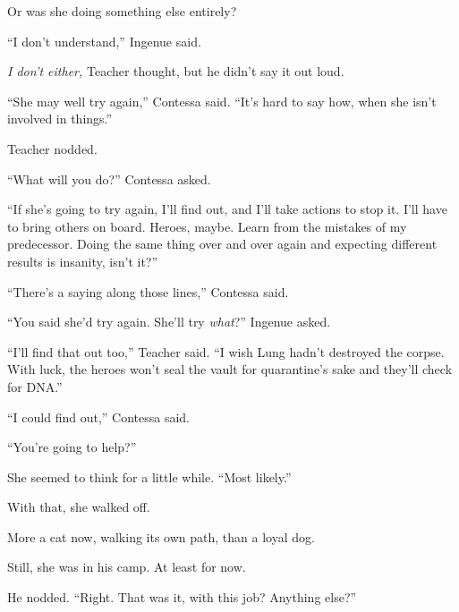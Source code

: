 Or was she doing something else entirely?



``I don't understand,'' Ingenue said.



\emph{I don't either, }Teacher thought, but he didn't say it out loud.



``She may well try again,'' Contessa said.  ``It's hard to say how, when she isn't involved in things.''



Teacher nodded.



``What will you do?''  Contessa asked.



``If she's going to try again, I'll find out, and I'll take actions to stop it.  I'll have to bring others on board.  Heroes, maybe.  Learn from the mistakes of my predecessor.  Doing the same thing over and over again and expecting different results is insanity, isn't it?''



``There's a saying along those lines,'' Contessa said.



``You said she'd try again.  She'll try \emph{what}?''  Ingenue asked.



``I'll find that out too,'' Teacher said.  ``I wish Lung hadn't destroyed the corpse.  With luck, the heroes won't seal the vault for quarantine's sake and they'll check for DNA.''



``I could find out,'' Contessa said.



``You're going to help?''



She seemed to think for a little while.  ``Most likely.''



With that, she walked off.



More a cat now, walking its own path, than a loyal dog.



Still, she was in his camp.  At least for now.



He nodded.  ``Right.  That was it, with this job?  Anything else?''



